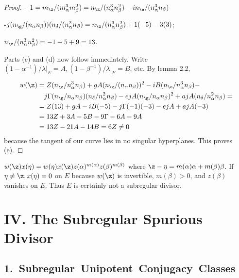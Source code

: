 \documentclass{memo-l}
\theoremstyle{definition}
\theoremstyle{remark}
\numberwithin{section}{chapter}
\numberwithin{equation}{chapter}
\begin{document}
\begin{proof}
\noindent
$-1 =   m_{{\z}}/(m_{\alpha}^{3}m_{\beta}^{2}) = 
n_{{\z}}/(n_{\alpha}^{3}n_{\beta}^{2}) - 
in_{{\e}}/(n_{\alpha}^{3}n_{\beta})$

-$j(n_{{\g}}/(n_{\alpha}n_{\beta}))
(n_{{\delta}}/(n_{\alpha}^{2}n_{\beta}) = 
n_{{\z}}/(n_{\alpha}^{3}n_{\beta}^{2}) + 1(-5) -3(3)$; 

$n_{{\z}}/(n_{\alpha}^{3}n_{\beta}^{2}) = -1+5+9 = 13$.

\medskip

\noindent
Parts (c) and (d) now follow immediately. 
 Write $(1-{\alpha}^{-1})/{\lambda} \vert_{E} = A, 
(1-{\beta}^{-1})/{\lambda} \vert_{E} = B$, etc. 
 By lemma 2.2,

\medskip

$$
\aligned
w({\z}) &=  Z(n_{{\z}}/n_{\alpha}^{3}n_{\beta}) + 
gA(n_{{\g}}/(n_{\alpha}n_{\beta}))^{2} - 
iB(n_{{\e}}/n_{\alpha}^{3}n_{\beta}) - \\      
&\quad j{\Gamma}(n_{{\g}}/n_{\alpha}n_{\beta})(n_{{\delta}}/n_{\alpha}^{2}
n_{\beta}) - ejA(n_{{\g}}/n_{\alpha}n_{\beta})^{2} + 
ajA(n_{{\delta}}/n_{\alpha}^{2}n_{\beta}) = \\
&= Z(13) + gA -iB(-5) -j{\Gamma}(-1)(-3) -ejA +ajA(-3) \\
&= 13Z + 3A -5B -9{\Gamma} -6A -9A \\
&= 13Z -21A -14B = 6Z \ne 0
\endaligned
$$ 
because the tangent of our curve lies in no singular hyperplanes. 
This proves (e).
\end{proof} 

\medpagebreak

\noindent
$w({\z})x({\eta}) = w({\eta})x({\z})z({\alpha})^{m({\alpha})}
z({\beta})^{m({\beta})}$ where ${\z}-{\eta} = 
m({\alpha}){\alpha}+m({\beta}){\beta}$. 
 If ${\eta}\ne {\z}, x({\eta}) = 0$ on $E$ because $w({\z})$ is 
invertible, $m({\beta}) > 0$, and $z({\beta})$ vanishes on $E$. 
 Thus $E$ is certainly not a subregular divisor.




\chapter{IV. The Subregular Spurious Divisor}




\section{ 1.\  Subregular\ Unipotent\ Conjugacy\ Classes}
\end{document}
